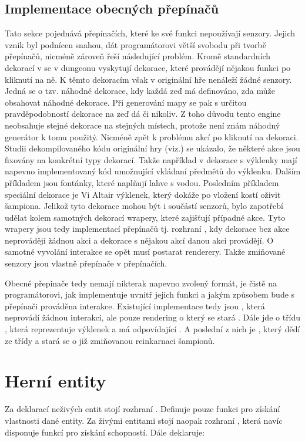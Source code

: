 \subsection{Implementace obecných přepínačů}
Tato sekce pojednává přepínačích, které ke své funkci nepoužívají senzory. Jejich vznik byl podnícen snahou, dát
programátorovi větší svobodu při tvorbě přepínačů, nicméně zároveň řeší následující problém. Kromě standardních
dekorací v se v dungeonu vyskytují dekorace, které provádějí nějakou funkci po kliknutí na ně. K těmto dekoracím však v originální
hře nenáleží žádné senzory. Jedná se o tzv. náhodné dekorace, kdy každá zeď má definováno, zda může obsahovat náhodné dekorace.
Při generování mapy se pak s určitou pravděpodobností dekorace na zeď dá či nikoliv. Z toho důvodu tento engine
neobsahuje stejné dekorace na stejných místech, protože není znám náhodný generátor k tomu použitý. Nicméně zpět 
k problému akcí po kliknutí na dekoraci. Studii dekompilovaného kódu originální hry  (viz.\cite{DMDekompilation}) se ukázalo,
že některé akce jsou fixovány na konkrétní typy dekorací. Takže například v dekorace s výklenky mají napevno implementovaný 
kód umožnující vkládaní předmětů do výklenku. Dalším příkladem jsou fontánky, které naplňují lahve s vodou. Posledním příkladem
speciální dekorace je Vi Altair výklenek, který dokáže po vložení kostí oživit šampiona. Jelikož tyto dekorace
mohou být i součástí senzorů, bylo zapotřebí udělat kolem samotných dekorací wrapery, které zajišťují případné akce.
Tyto wrapery jsou tedy implementací přepínačů tj. rozhraní , kdy dekorace bez akce neprovádějí žádnou akci a dekorace s nějakou akcí
danou akci provádějí. O samotné vyvolání interakce se opět musí postarat renderery. Takže zmiňované senzory jsou vlastně přepínače v přepínačích. 

Obecné přepinače tedy nemají nikterak napevno zvolený formát, je čistě na programátorovi, jak implementuje uvnitř jejich funkci a 
jakým způsobem bude s přepínači prováděna interakce. Existující implementace tedy jsou , která
neprovádí žádnou interakci, ale pouze rendering o který se stará . Dále jde o třídu ,
která reprezentuje výklenek a má odpovídající . A poslední z nich je , který dědí
ze třídy  a stará se o již zmiňovanou reinkarnaci šampionů.
 
\section{Herní entity}
Za deklarací neživých entit stojí rozhraní . Definuje pouze funkci pro získání vlastnosti dané entity.
Za živými entitami stojí naopak rozhraní , která navíc disponuje funkcí pro získání schopností. Dále
deklaruje:

